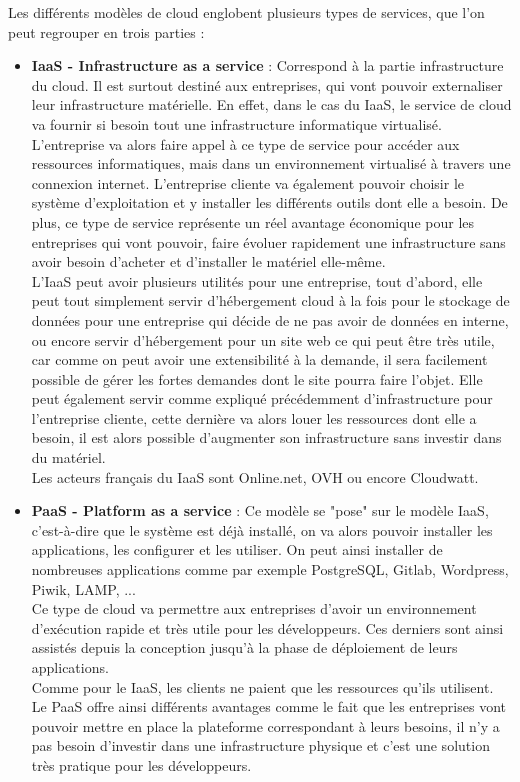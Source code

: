 \documentclass[]{article}
\begin{document}
Les différents modèles de cloud englobent plusieurs types de services,
que l'on peut regrouper en trois parties :
\begin{itemize}
\item  \textbf{IaaS - Infrastructure as a service} : Correspond à la partie infrastructure du cloud. Il est surtout destiné aux entreprises, qui vont pouvoir externaliser leur infrastructure matérielle. En effet, dans le cas du IaaS, le service de cloud va fournir si besoin tout une infrastructure informatique virtualisé.\\
L'entreprise va alors faire appel à ce type de service pour accéder aux ressources informatiques, mais dans un environnement virtualisé à travers une connexion internet. L'entreprise cliente va également pouvoir choisir le système d'exploitation et y installer les différents outils dont elle a besoin. De plus, ce type de service représente un réel avantage économique pour les entreprises qui vont pouvoir, faire évoluer rapidement une infrastructure sans avoir besoin d'acheter et d'installer le matériel elle-même.\\
L'IaaS peut avoir plusieurs utilités pour une entreprise, tout d'abord, elle peut tout simplement servir d'hébergement cloud à la fois pour le stockage de données pour une entreprise qui décide de ne pas avoir de données en interne, ou encore servir d'hébergement pour un site web ce qui peut être très utile, car comme on peut avoir une extensibilité à la demande, il sera facilement possible de gérer les fortes demandes dont le site pourra faire l'objet. Elle peut également servir comme expliqué précédemment d'infrastructure pour l'entreprise cliente, cette dernière va alors louer les ressources dont elle a besoin, il est alors possible d'augmenter son infrastructure sans investir dans du matériel.\\
Les acteurs français du IaaS sont Online.net, OVH ou encore Cloudwatt.

\item \textbf{PaaS - Platform as a service }: Ce modèle se "pose" sur le modèle IaaS, c'est-à-dire que le système est déjà installé, on va alors pouvoir installer les applications, les configurer et les utiliser. On peut ainsi installer de nombreuses applications comme par exemple PostgreSQL, Gitlab, Wordpress, Piwik, LAMP, ...\\
Ce type de cloud va permettre aux entreprises d'avoir un environnement d'exécution rapide et très utile pour les développeurs. Ces derniers sont ainsi assistés depuis la conception jusqu'à la phase de déploiement de leurs applications.\\
Comme pour le IaaS, les clients ne paient que les ressources qu'ils utilisent.
Le PaaS offre ainsi différents avantages comme le fait que les entreprises vont pouvoir mettre en place la plateforme correspondant à leurs besoins, il n'y a pas besoin d'investir dans une infrastructure physique et c'est une solution très pratique pour les développeurs.


\end{itemize}
\end{document}
